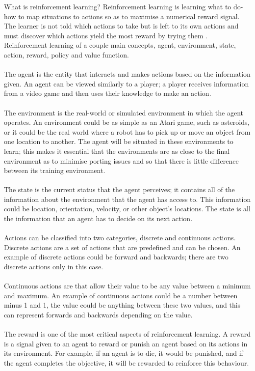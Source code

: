 \documentclass[a4paper,12pt]{article}
\begin{document}
What is reinforcement learning? Reinforcement learning is learning what to do-how to map situations to actions so as to maximise a numerical reward signal. The learner is not told which actions to take but is left to its own actions and must discover which actions yield the most reward by trying them \cite{sutton1992introduction}. Reinforcement learning of a couple main concepts, agent, environment, state, action, reward, policy and value function.
\\\\
The agent is the entity that interacts and makes actions based on the information given. An agent can be viewed similarly to a player; a player receives information from a video game and then uses their knowledge to make an action.
\\\\
The environment is the real-world or simulated environment in which the agent operates. An environment could be as simple as an Atari game, such as asteroids, or it could be the real world where a robot has to pick up or move an object from one location to another. The agent will be situated in these environments to learn; this makes it essential that the environments are as close to the final environment as to minimise porting issues and so that there is little difference between its training environment.
\\\\
The state is the current status that the agent perceives; it contains all of the information about the environment that the agent has access to. This information could be location, orientation, velocity, or other object's locations. The state is all the information that an agent has to decide on its next action.
\\\\
Actions can be classified into two categories, discrete and continuous actions. Discrete actions are a set of actions that are predefined and can be chosen. An example of discrete actions could be forward and backwards; there are two discrete actions only in this case.
\\\\
Continuous actions are that allow their value to be any value between a minimum and maximum. An example of continuous actions could be a number between minus 1 and 1, the value could be anything between these two values, and this can represent forwards and backwards depending on the value.
\\\\
The reward is one of the most critical aspects of reinforcement learning. A reward is a signal given to an agent to reward or punish an agent based on its actions in its environment. For example, if an agent is to die, it would be punished, and if the agent completes the objective, it will be rewarded to reinforce this behaviour.
\end{document}
